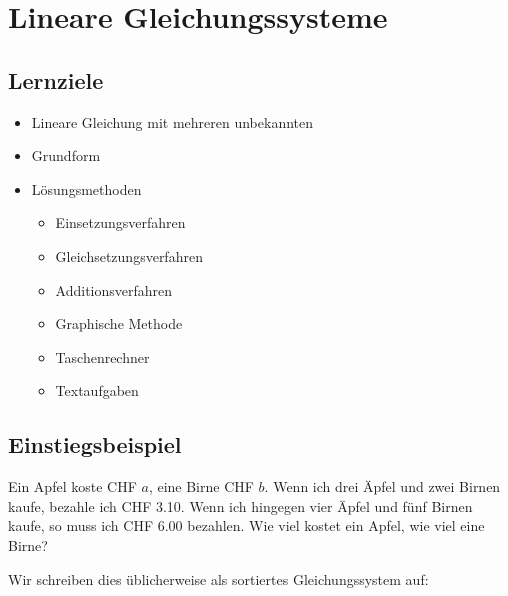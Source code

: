 \section{Lineare Gleichungssysteme}

\subsection*{Lernziele}
\begin{itemize}
	\item{Lineare Gleichung mit mehreren unbekannten}
	\item{Grundform}
	\item{Lösungsmethoden}
	\begin{itemize}
		\item{Einsetzungsverfahren}
		\item{Gleichsetzungsverfahren}
		\item{Additionsverfahren}
		\item{Graphische Methode}
		\item{Taschenrechner}
    \item Textaufgaben
	\end{itemize}

\end{itemize}

\newpage


\subsection{Einstiegsbeispiel}
Ein Apfel koste CHF $a$, eine Birne CHF $b$. Wenn ich drei Äpfel und zwei Birnen kaufe, bezahle ich CHF 3.10. Wenn ich hingegen vier Äpfel und fünf Birnen kaufe, so muss ich CHF 6.00 bezahlen. Wie viel kostet ein Apfel, wie viel eine Birne?




Wir schreiben dies üblicherweise als sortiertes Gleichungssystem auf:

